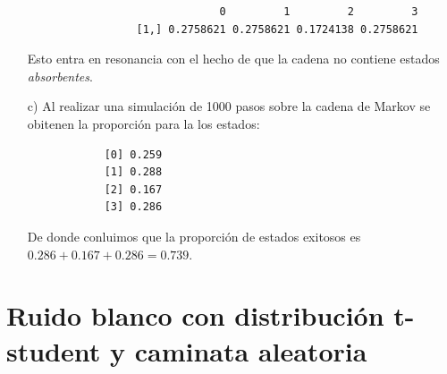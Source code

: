 \documentclass[11pt,letterpaper]{article}
\begin{document}
\begin{itemize}
		\begin{verbatim}
			                  0         1         2         3
			     [1,] 0.2758621 0.2758621 0.1724138 0.2758621
		\end{verbatim}
	
		Esto entra en resonancia con el hecho de que la cadena no contiene estados \textit{absorbentes}.
		
		\item[c)] Al realizar una simulación de 1000 pasos sobre la cadena de Markov se obitenen la proporción para la los estados:
		
		\begin{verbatim}
			[0] 0.259
			[1] 0.288
			[2] 0.167
			[3] 0.286
		\end{verbatim}
		
		De donde conluimos que la proporción de estados exitosos es $0.286+0.167+0.286=0.739$.
	\end{itemize}
	
	
	\section{Ruido blanco con distribución t-student y caminata aleatoria}
	
\end{document}
